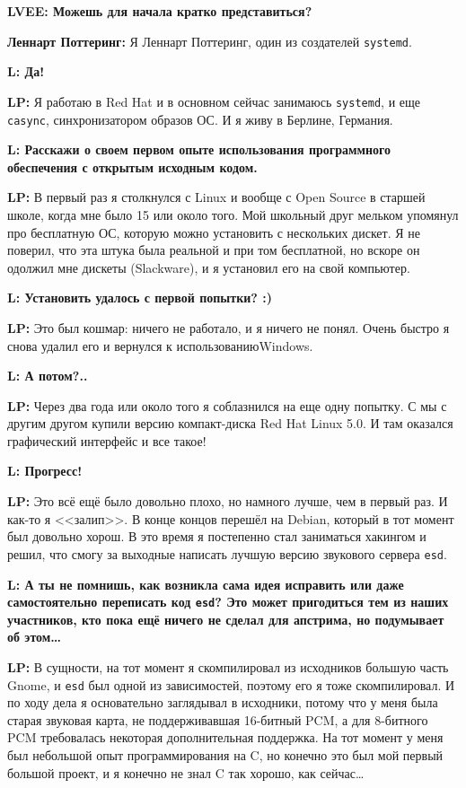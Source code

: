 \documentclass[10pt, a5paper]{article}
\begin{document}
\begin{Parallel}[p]{}{}
{{\noindent \bf LVEE: Можешь для начала кратко представиться?}

{\noindent \bf Леннарт Поттеринг:} Я Леннарт Поттеринг, один из создателей \verb!systemd!.

{\noindent \bf L: Да! }

{\noindent \bf LP:} Я работаю в Red Hat и в основном сейчас занимаюсь \verb!systemd!, и еще \verb!casync!, синхронизатором образов ОС. И я живу в Берлине, Германия.

{\noindent \bf L: Расскажи о своем первом опыте использования программного обеспечения с открытым исходным кодом.} 

{\noindent \bf LP:} В первый раз я столкнулся с Linux и вообще с Open Source в старшей школе, когда мне было 15 или около того. Мой школьный друг мельком упомянул про бесплатную ОС, которую можно установить с нескольких дискет. Я не поверил, что эта штука была реальной и при том бесплатной, но вскоре он одолжил мне дискеты (Slackware), и я установил его на свой компьютер.

{\noindent \bf L: Установить удалось с первой попытки? :) }

{\noindent \bf LP:} Это был кошмар: ничего не работало, и я ничего не понял. Очень быстро я снова удалил его и вернулся к использованию\linebreak Windows.

{\noindent \bf L: А потом?..}

{\noindent \bf LP:} Через два года или около того я соблазнился на еще одну попытку. С мы с другим другом купили версию компакт-диска Red Hat Linux 5.0. И там оказался графический интерфейс и все такое!
 
{\noindent \bf L: Прогресс!}

{\noindent \bf LP:} Это всё ещё было довольно плохо, но намного лучше, чем в первый раз. И как-то я <<залип>>. В конце концов перешёл на Debian, который в тот момент был довольно хорош. В это время я постепенно стал заниматься хакингом и решил, что смогу за выходные написать лучшую версию звукового сервера \verb!esd!.

{\noindent \bf L: А ты не помнишь, как возникла сама идея исправить или даже самостоятельно переписать код \verb!esd!? Это может пригодиться тем из наших участников, кто пока ещё ничего не сделал для апстрима, но подумывает об этом\ldots}

{\noindent \bf LP:} В сущности, на тот момент я скомпилировал из исходников большую часть Gnome, и \verb!esd! был одной из зависимостей, поэтому его я тоже скомпилировал. И по ходу дела я основательно заглядывал в исходники, потому что у меня была старая звуковая карта, не поддерживавшая 16-битный PCM, а для 8-битного PCM требовалась некоторая дополнительная поддержка. На тот момент у меня был небольшой опыт программирования на C, но конечно это был мой первый большой проект, и я конечно не знал C так хорошо, как сейчас\ldots

}
\end{Parallel}
\end{document}
